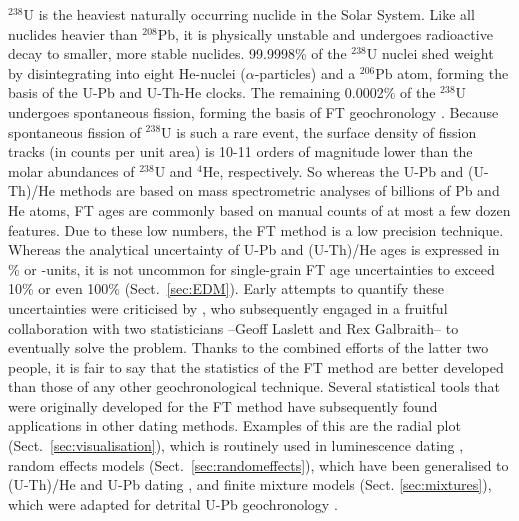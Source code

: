 \documentclass{article}
\begin{document}
$^{238}$U is the heaviest naturally occurring nuclide in the Solar
System. Like all nuclides heavier than $^{208}$Pb, it is physically
unstable and undergoes radioactive decay to smaller, more stable
nuclides. 99.9998\% of the $^{238}$U nuclei shed weight by
disintegrating into eight He-nuclei ($\alpha$-particles) and a
$^{206}$Pb atom, forming the basis of the U-Pb and U-Th-He clocks. The
remaining 0.0002\% of the $^{238}$U undergoes spontaneous fission,
forming the basis of FT geochronology \citep{price1963,
  fleischer1965}. Because spontaneous fission of $^{238}$U is such a
rare event, the surface density of fission tracks (in counts per unit
area) is 10-11 orders of magnitude lower than the molar abundances of
$^{238}$U and $^4$He, respectively.  So whereas the U-Pb and (U-Th)/He
methods are based on mass spectrometric analyses of billions of Pb and
He atoms, FT ages are commonly based on manual counts of at most a few
dozen features. Due to these low numbers, the FT method is a low
precision technique. Whereas the analytical uncertainty of U-Pb and
(U-Th)/He ages is expressed in \% or \permil-units, it is not uncommon
for single-grain FT age uncertainties to exceed 10\% or even 100\%
(Sect.~\ref{sec:EDM}). Early attempts to quantify these uncertainties
\citep{mcgee1979,johnson1979} were criticised by
\citet{green1981a,green1981b}, who subsequently engaged in a fruitful
collaboration with two statisticians --Geoff Laslett and Rex
Galbraith-- to eventually solve the problem. Thanks to the combined
efforts of the latter two people, it is fair to say that the
statistics of the FT method are better developed than those of any
other geochronological technique. Several statistical tools that were
originally developed for the FT method have subsequently found
applications in other dating methods. Examples of this are the radial
plot (Sect.~\ref{sec:visualisation}), which is routinely used in
luminescence dating \citep{galbraith2010}, random effects models
(Sect.~\ref{sec:randomeffects}), which have been generalised to
(U-Th)/He \citep{vermeesch2010a} and U-Pb dating \citep{rioux2012},
and finite mixture models (Sect. \ref{sec:mixtures}), which were
adapted for detrital U-Pb geochronology \citep{sambridge1994}.\\
\end{document}
